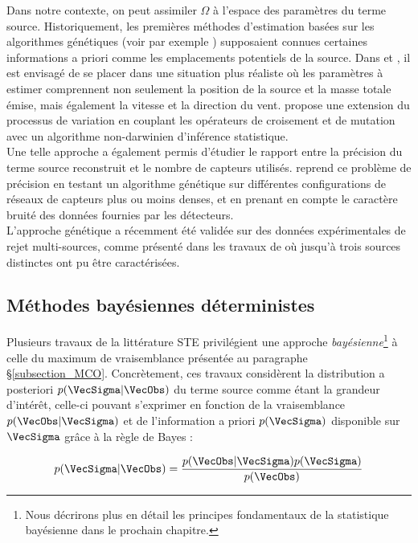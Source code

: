  Dans notre contexte, on peut assimiler $\Omega$ à l'espace des paramètres du terme source. Historiquement, les premières méthodes d'estimation basées sur les algorithmes génétiques (voir par exemple \cite{Haupt2005}) supposaient connues certaines informations a priori comme les emplacements potentiels de la source. Dans \cite{Allen2007} et \cite{Haupt2007}, il est envisagé de se placer dans une situation plus réaliste où les paramètres à estimer comprennent non seulement la position de la source et la masse totale émise, mais également la vitesse et la direction du vent. \cite{Cervone2011} propose une extension du processus de variation en couplant les opérateurs de croisement et de mutation avec un algorithme non-darwinien d'inférence statistique.\\ 
 
 Une telle approche a également permis d'étudier le rapport entre la précision du terme source reconstruit et le nombre de capteurs utilisés. \cite{Long2010} reprend ce problème de précision en testant un algorithme génétique sur différentes configurations de réseaux de capteurs plus ou moins denses, et en prenant en compte le caractère bruité des données fournies par les détecteurs. \\
 
 L'approche génétique a récemment été validée sur des données expérimentales de rejet multi-sources, comme présenté dans les travaux de \cite{Cantelli2015} où jusqu'à trois sources distinctes ont pu être caractérisées.\\
 
 \subsection{Méthodes bayésiennes déterministes}
 
 Plusieurs travaux de la littérature STE privilégient une approche \textit{bayésienne}\footnote{Nous décrirons plus en détail les principes fondamentaux de la statistique bayésienne dans le prochain chapitre.} à celle du maximum de vraisemblance présentée au paragraphe §\ref{subsection_MCO}. Concrètement, ces travaux considèrent la distribution a posteriori $p(\VecSigma|\VecObs)$ du terme source comme étant la grandeur d'intérêt, celle-ci pouvant s'exprimer en fonction de la vraisemblance $p(\VecObs | \VecSigma)$ et de l'information a priori $p(\VecSigma)$ disponible sur $\VecSigma$ grâce à la règle de Bayes : 
 
 \begin{equation}
 p(\VecSigma|\VecObs) = \dfrac{p(\VecObs | \VecSigma)p(\VecSigma)}{p(\VecObs)}
 \label{eq_regle_bayes_edl}
 \end{equation}
 
